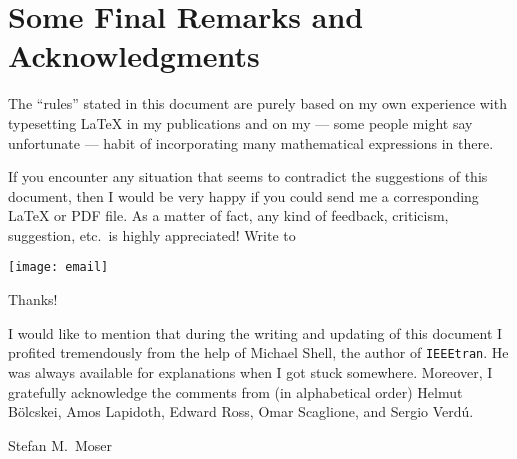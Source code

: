 \documentclass[a4paper,11pt]{article}
\makeatletter
\let\lsspageref\pageref
\newcommand{\dd}{\mathop{}\!\mathrm{d}}
\newcounter{exacnt}
\newlength{\savefboxrule}
\newlength{\savefboxsep}
\newlength{\outdent}
\newenvironment{latexcode}%
{\begingroup%
  \@bsphack
  \immediate\openout \latexcode@out \jobname.exa
  \let\do\@makeother\dospecials\catcode`\^^M\active
  \def\verbatim@processline{%
    \immediate\write\latexcode@out{\the\verbatim@line}}%
  \verbatim@start}%
{\immediate\closeout\latexcode@out\@esphack\endgroup%
  \stepcounter{exacnt}%
  \setlength{\parindent}{0pt}%
  \par\addvspace{3.0ex plus 0.8ex minus 0.5ex}\vskip -\parskip
\expandafter\ifx\csname r@exa\theexacnt\endcsname\relax\else
  \ifodd\HyPsd@pageref{exa\theexacnt}\hspace*{0pt}\else\hspace*{-\outdent}\fi%
\fi
\makebox[\linewidth][l]{%
  \begin{minipage}[c]{0.5\outdent+0.46\linewidth-3mm}%
    \small
  \end{minipage}%
  \hspace{5mm}%
  \setlength{\savefboxrule}{\fboxrule}%
  \setlength{\fboxrule}{0.1pt}%
  \setlength{\savefboxsep}{\fboxsep}%
  \setlength{\fboxsep}{3mm}%
  \fbox{%
    \begin{minipage}{0.5\outdent+0.54\linewidth-3.5mm-2\fboxrule-2\fboxsep}%
      \setlength{\fboxrule}{\savefboxrule}%
      \setlength{\fboxsep}{\savefboxsep}%
      \setlength{\fboxrule}{0.5pt}%
      \setlength{\parskip}{1ex plus 0.4ex minus 0.2ex}%
      \begin{trivlist}\item\small
      \end{trivlist}
    \end{minipage}
    }%
}\label{exa\theexacnt}%
\par\addvspace{3ex plus 0.8ex minus 0.5ex}\vskip -\parskip
}
\newenvironment{latexcodeonly}%
{\begingroup%
  \@bsphack
  \immediate\openout \latexcode@out \jobname.exa
  \let\do\@makeother\dospecials\catcode`\^^M\active
  \def\verbatim@processline{%
    \immediate\write\latexcode@out{\the\verbatim@line}}%
  \verbatim@start}%
{\immediate\closeout\latexcode@out\@esphack\endgroup%
  \stepcounter{exacnt}%
  \setlength{\parindent}{0pt}%
  \par\addvspace{3.0ex plus 0.8ex minus 0.5ex}\vskip -\parskip
\expandafter\ifx\csname r@exa\theexacnt\endcsname\relax\else
  \ifodd\HyPsd@pageref{exa\theexacnt}\hspace*{0pt}\else\hspace*{-\outdent}\fi%
\fi
\makebox[\linewidth][l]{%
  \begin{minipage}[c]{0.9\outdent+0.46\linewidth-3mm}%
    \small
  \end{minipage}%
  \hspace{5mm}%
  \setlength{\savefboxrule}{\fboxrule}%
  \setlength{\fboxrule}{0.1pt}%
  \setlength{\savefboxsep}{\fboxsep}%
  \setlength{\fboxsep}{3mm}%
}\label{exa\theexacnt}%
\par\addvspace{3ex plus 0.8ex minus 0.5ex}\vskip -\parskip
}
\makeatother
\begin{document}




\section{Some Final Remarks and Acknowledgments}
\label{sec:some-final-remarks}

The ``rules'' stated in this document are purely based on my own
experience with typesetting \LaTeX{} in my publications and on my ---
some people might say unfortunate --- habit of incorporating many
mathematical expressions in there.

If you encounter any situation that seems to contradict the
suggestions of this document, then I would be very happy if you could
send me a corresponding \LaTeX{} or PDF file.  As a matter of fact,
any kind of feedback, criticism, suggestion, etc.\ is highly
appreciated!  Write to
\begin{center}
  \texttt{[image: email]}
\end{center}
Thanks!

I would like to mention that during the writing and updating of this
document I profited tremendously from the help of Michael Shell, the
author of \verb+IEEEtran+. He was always available for explanations
when I got stuck somewhere. Moreover, I gratefully acknowledge the
comments from (in alphabetical order) Helmut B\"olcskei, Amos
Lapidoth, Edward Ross, Omar Scaglione, and Sergio Verd\'u.

\vspace{0.7cm} 
\hfill Stefan M.~Moser


\vspace{15mm}
\printindex
\end{document}

